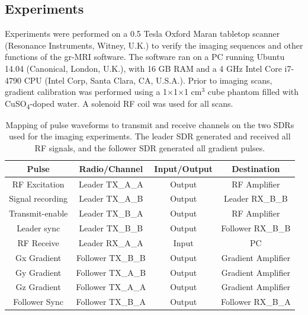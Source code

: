 \documentclass[review]{elsarticle}
\begin{document}
\subsection{Experiments}\label{Experiments}
Experiments were performed on a 0.5 Tesla Oxford Maran tabletop scanner (Resonance Instruments, Witney, U.K.)
to verify the imaging sequences and other functions of the gr-MRI software. 
The software ran on a PC running Ubuntu 14.04 (Canonical, London, U.K.), 
with 16 GB RAM and a 4 GHz Intel Core i7-4790 CPU (Intel Corp, Santa Clara, CA, U.S.A.).
Prior to imaging scans, gradient calibration was performed using a
1$\times$1$\times$1 cm$^3$ cube phantom filled with CuSO\textsubscript{4}-doped water.
A solenoid RF coil was used for all scans.

\begin{table}[!ht]
\begin{tabular}[c]{| c | c | c | c |}
	\hline
	\textbf{Pulse} & \textbf{Radio/Channel} & \textbf{Input/Output} & \textbf{Destination} \\ \hline
	RF Excitation & Leader TX\_A\_A & Output & RF Amplifier\\ \hline
	Signal recording & Leader TX\_A\_B & Output & Leader RX\_B\_B\\ \hline
	Transmit-enable & Leader TX\_B\_A & Output & RF Amplifier\\ \hline
	Leader sync & Leader TX\_B\_B & Output & Follower RX\_B\_B\\ \hline
	RF Receive & Leader RX\_A\_A & Input & PC \\ \hline
	Gx Gradient & Follower TX\_B\_B & Output & Gradient Amplifier\\ \hline
	Gy Gradient & Follower TX\_A\_B & Output & Gradient Amplifier\\ \hline
	Gz Gradient & Follower TX\_A\_A & Output & Gradient Amplifier\\ \hline
	Follower Sync & Follower TX\_B\_A & Output & Follower RX\_B\_A\\ \hline
\end{tabular}
\caption{Mapping of pulse waveforms to transmit and receive channels on the two SDRs used for the imaging experiments.
The leader SDR generated and received all RF signals,
and the follower SDR generated all gradient pulses.}
\label{table:hardware}
\end{table}
\end{document}

